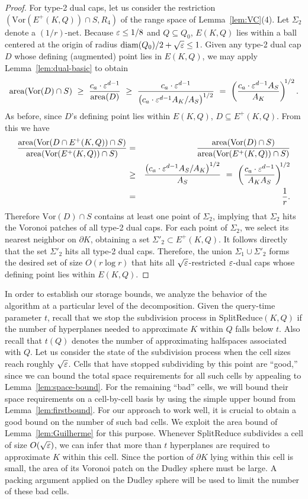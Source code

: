 \documentclass[11pt]{article}   \usepackage[letterpaper,hmargin=2.1cm,vmargin=3cm]{geometry}
\newcommand{\inv}[1]{\frac{1}{#1}}
\newcommand{\alg}{\textrm{SplitReduce}}
\newcommand{\diam}{\mathrm{diam}}
\newcommand{\area}{\mathrm{area}}
\newcommand{\Vor}{\mathrm{Vor}}
\begin{document}
\begin{proof}
For type-2 dual caps, let us consider the restriction $(\Vor(E^+(K,Q)) \cap S,R_4)$ of the range space of Lemma~\ref{lem:VC}(4). Let $\Sigma_2$ denote a $(1/r)$-net. Because $\varepsilon \le 1/8$ and $Q \subseteq Q_0$, $E(K,Q)$ lies within a ball centered at the origin of radius $\diam(Q_0)/2 + \sqrt{\eps} \le 1$. Given any type-2 dual cap $D$ whose defining (augmented) point lies in $E(K,Q)$, we may apply Lemma~\ref{lem:dual-basic} to obtain
\[
	\area(\Vor(D) \cap S)
		~ \ge ~ \frac{c_a \cdot \eps^{d-1}}{\area(D)}
		~ \ge ~ \frac{c_a \cdot \eps^{d-1}}{\big(c_a \cdot \eps^{d-1} A_K / A_S\big)^{1/2}}
		~  =  ~ \left(\frac{c_a \cdot \eps^{d-1} A_S}{A_K}\right)^{\N 1/2}.
\]
As before, since $D$'s defining point lies within $E(K,Q)$, $D \subseteq E^+(K,Q)$. From this we have
\begin{eqnarray*}
	\frac{\area(\Vor(D \cap E^+(K,Q)) \cap S)}{\area(\Vor(E^+(K,Q)) \cap S)} 
		&  =  & \frac{\area(\Vor(D) \cap S)}{\area(\Vor(E^+(K,Q)) \cap S)}  \\
		& \ge & \frac{\big(c_a \cdot \eps^{d-1} A_S/A_K\big)^{1/2}}{A_S} 
		~  =  ~ \left(\frac{c_a \cdot\eps^{d-1}}{A_K A_S}\right)^{\N 1/2} \\
		&  =  & \inv{r}.
\end{eqnarray*}
Therefore $\Vor(D) \cap S$ contains at least one point of $\Sigma_2$, implying that $\Sigma_2$ hits the Voronoi patches of all type-2 dual caps. For each point of $\Sigma_2$, we select its nearest neighbor on $\partial K$, obtaining a set $\Sigma'_2 \subset E^+(K,Q)$. It follows directly that the set $\Sigma'_2$ hits all type-2 dual caps. Therefore, the union $\Sigma_1 \cup \Sigma'_2$ forms the desired set of size $O(r \log r)$ that hits all $\sqrt{\varepsilon}$-restricted $\varepsilon$-dual caps whose defining point lies within $E(K,Q)$.
\end{proof}


In order to establish our storage bounds, we analyze the behavior of the algorithm at a particular level of the decomposition. Given the query-time parameter $t$, recall that we stop the subdivision process in $\alg(K,Q)$ if the number of hyperplanes needed to approximate $K$ within $Q$ falls below $t$. Also recall that $t(Q)$ denotes the number of approximating halfspaces associated with $Q$. Let us consider the state of the subdivision process when the cell sizes reach roughly $\sqrt{\varepsilon}$. Cells that have stopped subdividing by this point are ``good,'' since we can bound the total space requirements for all such cells by appealing to Lemma~\ref{lem:space-bound}. For the remaining ``bad'' cells, we will bound their space requirements on a cell-by-cell basis by using the simple upper bound from Lemma~\ref{lem:firstbound}. For our approach to work well, it is crucial to obtain a good bound on the number of such bad cells. We exploit the area bound of Lemma~\ref{lem:Guilherme} for this purpose. Whenever {\alg} subdivides a cell of size $O(\sqrt{\varepsilon})$, we can infer that more than $t$ hyperplanes are required to approximate $K$ within this cell. Since the portion of $\partial K$ lying within this cell is small, the area of its Voronoi patch on the Dudley sphere must be large. A packing argument applied on the Dudley sphere will be used to limit the number of these bad cells.
\end{document}
